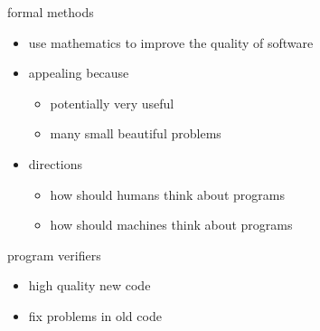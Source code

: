 \documentclass{beamer}
\title{\titletext}
\author{Radu Grigore}
\date{23 August 2010}
\begin{document}
\maketitle
\begin{frame}
  \begin{block}{formal methods}
  \begin{itemize}
  \item use mathematics to improve the quality of software
  \item appealing because
    \begin{itemize}
    \item potentially very useful
    \item many small beautiful problems
    \end{itemize}
  \item directions
    \begin{itemize}
    \item how should humans think about programs
    \item how should machines think about programs
    \end{itemize}
  \end{itemize}
  \end{block}

  \begin{block}{program verifiers}
  \begin{itemize}
  \item high quality new code
  \item fix problems in old code
  \end{itemize}
  \end{block}
\end{frame}
\end{document}
